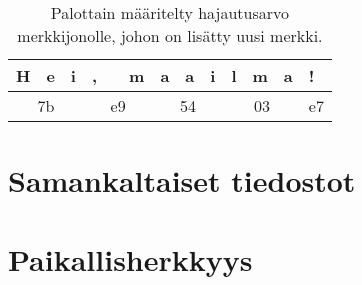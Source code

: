 \begin{table}[h]
  \centering
  \begin{tabular}{|lll|lll|lll|lll|l|}
    \hline
    \multicolumn{1}{|l|}{H} & \multicolumn{1}{l|}{e} & i & \multicolumn{1}{l|}{{\color[HTML]{FF0000} ,}} & \multicolumn{1}{l|}{} & m & \multicolumn{1}{l|}{a} & \multicolumn{1}{l|}{a} & i & \multicolumn{1}{l|}{l} & \multicolumn{1}{l|}{m} & a & !                         \\ \hline
    \multicolumn{3}{|c|}{7b}                             & \multicolumn{3}{c|}{{\color[HTML]{FF0000} e9}}                            & \multicolumn{3}{c|}{{\color[HTML]{FF0000} 54}}      & \multicolumn{3}{c|}{{\color[HTML]{FF0000} 03}}      & {\color[HTML]{FF0000} e7} \\ \hline
  \end{tabular}
  \caption{Palottain määritelty hajautusarvo merkkijonolle, johon on lisätty uusi merkki.}
\end{table}

\section{Samankaltaiset tiedostot}
\section{Paikallisherkkyys}


